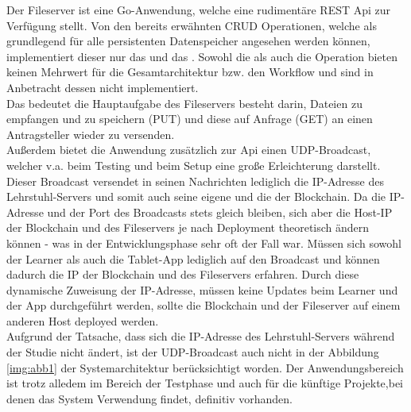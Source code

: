 Der Fileserver ist eine Go-Anwendung, welche eine rudimentäre REST \cite{REST:Wiki} Api \cite{API:Wiki} zur Verfügung stellt.
Von den bereits erwähnten CRUD \cite{CRUD:Wiki TO-DO!!!} Operationen, welche als grundlegend für alle persistenten Datenspeicher angesehen werden können, implementiert dieser nur das  und das . Sowohl die  als auch die  Operation bieten keinen Mehrwert für die Gesamtarchitektur bzw. den Workflow und sind in Anbetracht dessen nicht implementiert.\\
Das bedeutet die Hauptaufgabe des Fileservers besteht darin, Dateien zu empfangen und zu speichern (PUT) und diese auf Anfrage (GET) an einen Antragsteller wieder zu versenden.\\
Außerdem bietet die Anwendung zusätzlich zur Api einen UDP-Broadcast, welcher v.a. beim Testing und beim Setup eine große Erleichterung darstellt. Dieser Broadcast versendet in seinen Nachrichten lediglich die IP-Adresse des Lehrstuhl-Servers und somit auch seine eigene und die der Blockchain.
Da die IP-Adresse und der Port des Broadcasts stets gleich bleiben, sich aber die Host-IP der Blockchain und des Fileservers je nach Deployment theoretisch ändern können - was in der Entwicklungsphase sehr oft der Fall war. Müssen sich sowohl der Learner als auch die Tablet-App lediglich auf den Broadcast  und können dadurch die IP der Blockchain und des Fileservers erfahren. Durch diese dynamische Zuweisung der IP-Adresse, müssen keine Updates beim Learner und der App durchgeführt werden, sollte die Blockchain und der Fileserver auf einem anderen Host deployed werden. \\
Aufgrund der Tatsache, dass sich die IP-Adresse des Lehrstuhl-Servers während der Studie nicht ändert, ist der UDP-Broadcast auch nicht in der Abbildung \ref{img:abb1} der Systemarchitektur berücksichtigt worden. Der Anwendungsbereich ist trotz alledem im Bereich der Testphase und auch für die künftige Projekte,bei denen das System Verwendung findet, definitiv vorhanden.

